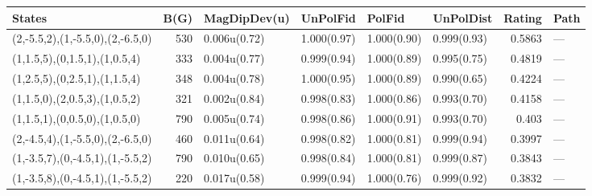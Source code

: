 \begin{tabular}{lrllllrl}
\hline
 States                           &   B(G) & MagDipDev(u)   & UnPolFid    & PolFid      & UnPolDist   &   Rating & Path   \\
\hline
 (2,-5.5,2),(1,-5.5,0),(2,-6.5,0) &    530 & 0.006u(0.72)   & 1.000(0.97) & 1.000(0.90) & 0.999(0.93) &   0.5863 & ---    \\
 (1,1.5,5),(0,1.5,1),(1,0.5,4)    &    333 & 0.004u(0.77)   & 0.999(0.94) & 1.000(0.89) & 0.995(0.75) &   0.4819 & ---    \\
 (1,2.5,5),(0,2.5,1),(1,1.5,4)    &    348 & 0.004u(0.78)   & 1.000(0.95) & 1.000(0.89) & 0.990(0.65) &   0.4224 & ---    \\
 (1,1.5,0),(2,0.5,3),(1,0.5,2)    &    321 & 0.002u(0.84)   & 0.998(0.83) & 1.000(0.86) & 0.993(0.70) &   0.4158 & ---    \\
 (1,1.5,1),(0,0.5,0),(1,0.5,0)    &    790 & 0.005u(0.74)   & 0.998(0.86) & 1.000(0.91) & 0.993(0.70) &   0.403  & ---    \\
 (2,-4.5,4),(1,-5.5,0),(2,-6.5,0) &    460 & 0.011u(0.64)   & 0.998(0.82) & 1.000(0.81) & 0.999(0.94) &   0.3997 & ---    \\
 (1,-3.5,7),(0,-4.5,1),(1,-5.5,2) &    790 & 0.010u(0.65)   & 0.998(0.84) & 1.000(0.81) & 0.999(0.87) &   0.3843 & ---    \\
 (1,-3.5,8),(0,-4.5,1),(1,-5.5,2) &    220 & 0.017u(0.58)   & 0.999(0.94) & 1.000(0.76) & 0.999(0.92) &   0.3832 & ---    \\
\hline
\end{tabular}